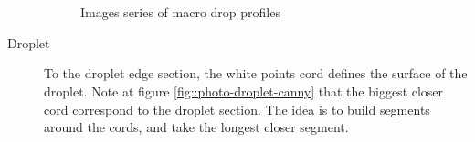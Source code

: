 \documentclass[12pt]{iopart}
\begin{document}
\begin{description}
\begin{figure}[h!]
\begin{center}    
\\
\\
\end{center}
\caption{{\small Images series of macro drop profiles}}
\label{fig::photo-results-macro-drop}
\end{figure}
               
\item[ Droplet]
To the droplet edge section, the white points cord defines 
the surface of the droplet. Note at figure \ref{fig::photo-droplet-canny} that the biggest closer
 cord correspond to the droplet section. The idea is to build segments around
 the cords, and take the longest closer segment. 
                

\end{description}
\end{document}
